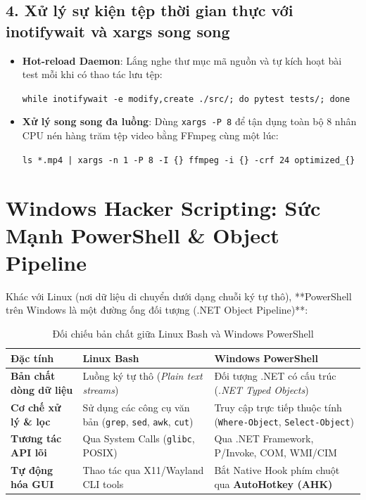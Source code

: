 \documentclass[a4paper,11pt]{article}
\begin{document}
\subsection{4. Xử lý sự kiện tệp thời gian thực với inotifywait và xargs song song}
\begin{itemize}[leftmargin=1.5em]
    \item \textbf{Hot-reload Daemon}: Lắng nghe thư mục mã nguồn và tự kích hoạt bài test mỗi khi có thao tác lưu tệp:
    \begin{center}
    \texttt{while inotifywait -e modify,create ./src/; do pytest tests/; done}
    \end{center}
    \item \textbf{Xử lý song song đa luồng}: Dùng \texttt{xargs -P 8} để tận dụng toàn bộ 8 nhân CPU nén hàng trăm tệp video bằng FFmpeg cùng một lúc:
    \begin{center}
    \texttt{ls *.mp4 | xargs -n 1 -P 8 -I \{\} ffmpeg -i \{\} -crf 24 optimized\_\{\}}
    \end{center}
\end{itemize}

\section{Windows Hacker Scripting: Sức Mạnh PowerShell \& Object Pipeline}

Khác với Linux (nơi dữ liệu di chuyển dưới dạng chuỗi ký tự thô), **PowerShell trên Windows là một đường ống đối tượng (.NET Object Pipeline)**:

\begin{table}[htbp]
\centering
\small
\caption{Đối chiếu bản chất giữa Linux Bash và Windows PowerShell}
\vspace{0.5em}
\begin{tabularx}{\textwidth}{L{3cm} L{5cm} Y}
\toprule
\textbf{Đặc tính} & \textbf{Linux Bash} & \textbf{Windows PowerShell} \\
\midrule
\textbf{Bản chất dòng dữ liệu} & Luồng ký tự thô (\textit{Plain text streams}) & Đối tượng .NET có cấu trúc (\textit{.NET Typed Objects}) \\
\textbf{Cơ chế xử lý \& lọc} & Sử dụng các công cụ văn bản (\texttt{grep}, \texttt{sed}, \texttt{awk}, \texttt{cut}) & Truy cập trực tiếp thuộc tính (\texttt{Where-Object}, \texttt{Select-Object}) \\
\textbf{Tương tác API lõi} & Qua System Calls (\texttt{glibc}, POSIX) & Qua .NET Framework, P/Invoke, COM, WMI/CIM \\
\textbf{Tự động hóa GUI} & Thao tác qua X11/Wayland CLI tools & Bắt Native Hook phím chuột qua \textbf{AutoHotkey (AHK)} \\
\bottomrule
\end{tabularx}
\end{table}
\end{document}

